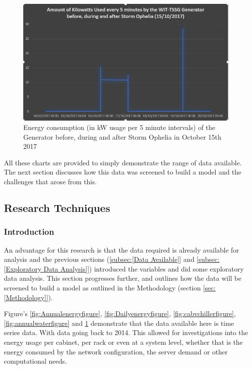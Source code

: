 \documentclass[12pt]{scrartcl}
\begin{document}
\begin{figure}[H]
  \caption{Energy consumption (in kW usage per 5 minute intervals) of the Generator before, during and after Storm Ophelia in October 15th 2017}
  \label{fig:opheliafigure}
  \centering
    \includegraphics[scale=0.50]{Ophelia_generator}
\end{figure} 

All these charts are provided to simply demonstrate the range of data available. The next section discusses how this data was screened to build a model and the challenges that arose from this.  

\subsection{Research Techniques}
\label{subsec:[Research Techniques]}

\subsubsection{Introduction}
\label{subsubsec:[Introduction]}

An advantage for this research is that the data required is already available for analysis and the previous sections (\ref{subsec:[Data Available]} and \ref{subsec:[Exploratory Data Analysis]}) introduced the variables and did some exploratory data analysis. This section progresses further, and outlines how the data will be screened to build a model as outlined in the Methodology (section \ref{sec:[Methodology]}). 

Figure's \ref{fig:Annualenergyfigure}, \ref{fig:Dailyenergyfigure}, \ref{fig:cabvchillerfigure}, \ref{fig:annualwaterfigure} and \ref{fig:opheliafigure} demonstrate that the data available here is time series data. With data going back to 2014. This allowed for investigations into the energy usage per cabinet, per rack or even at a system level, whether that is the energy consumed by the network configuration, the server demand or other computational needs. 
\end{document}
